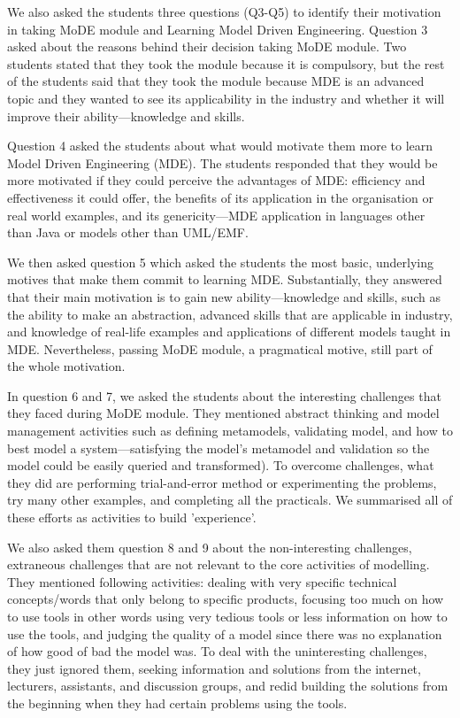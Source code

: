 \documentclass[12pt, a4paper]{report}
\begin{document}
We also asked the students three questions (Q3-Q5) to identify their motivation in taking MoDE module and Learning Model Driven Engineering. Question 3 asked about the reasons behind their decision taking MoDE module. Two students stated that they took the module because it is compulsory, but the rest of the students said that they took the module because MDE is an advanced topic and they wanted to see its applicability in the industry and whether it will improve their ability---knowledge and skills. 

Question 4 asked the students about what would motivate them more to learn Model Driven Engineering (MDE). The students responded that they would be more motivated if they could perceive the advantages of MDE: efficiency and effectiveness it could offer, the benefits of its application in the organisation or real world examples, and its genericity---MDE application in languages other than Java or models other than UML/EMF.

We then asked question 5 which asked the students the most basic, underlying motives that make them commit to learning MDE. Substantially, they answered that their main motivation is to gain new ability---knowledge and skills, such as the ability to make an abstraction, advanced skills that are applicable in industry, and knowledge of real-life examples and applications of different models taught in MDE. Nevertheless, passing MoDE module, a pragmatical motive, still part of the whole motivation. 

In question 6 and 7, we asked the students about the interesting challenges that they faced during MoDE module. They mentioned abstract thinking and model management activities such as defining metamodels, validating model, and how to best model a system---satisfying the model's metamodel and validation so the model could be easily queried and transformed). To overcome challenges, what they did are performing trial-and-error method or experimenting the problems, try many other examples, and completing all the practicals. We summarised all of these efforts as activities to build 'experience'.

We also asked them question 8 and 9 about the non-interesting challenges, extraneous challenges that are not relevant to the core activities of modelling. They mentioned following activities: dealing with very specific technical concepts/words that only belong to specific products, focusing too much on how to use tools in other words using very tedious tools or less information on how to use the tools, and judging the quality of a model since there was no explanation of how good of bad the model was. To deal with the uninteresting challenges, they just ignored them, seeking information and solutions from the internet, lecturers, assistants, and discussion groups, and redid building the solutions from the beginning when they had certain problems using the tools.
\end{document}
